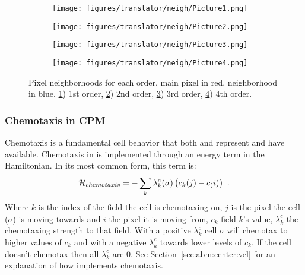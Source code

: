 \begin{figure}[H]
    \centering
    \begin{subfigure}{.45\textwidth}
        \texttt{[image: figures/translator/neigh/Picture1.png]}
        \caption{}\label{fig:trans:neigh:1}
    \end{subfigure}
    \begin{subfigure}{.45\textwidth}
        \texttt{[image: figures/translator/neigh/Picture2.png]}
        \caption{}\label{fig:trans:neigh:2}
    \end{subfigure}

    \begin{subfigure}{.45\textwidth}
        \texttt{[image: figures/translator/neigh/Picture3.png]}
        \caption{}\label{fig:trans:neigh:3}
    \end{subfigure}
    \begin{subfigure}{.45\textwidth}
        \texttt{[image: figures/translator/neigh/Picture4.png]}
        \caption{}\label{fig:trans:neigh:4}
    \end{subfigure}
    \caption{Pixel neighborhoods for each order, main pixel in red, neighborhood in blue. \ref{fig:trans:neigh:1}) 1st order, \ref{fig:trans:neigh:2}) 2nd order, \ref{fig:trans:neigh:3}) 3rd order, \ref{fig:trans:neigh:4}) 4th order.}
    \label{fig:trans:neigh}
\end{figure}



\subsubsection{Chemotaxis in CPM}\label{sec:abm:apm-history:chemotaxis-cpm}


Chemotaxis is a fundamental cell behavior that both \ccds and \pscs represent and have available. Chemotaxis in \ccds is implemented through an energy term in the Hamiltonian. In its most common form, this term is:
\begin{equation}
    \mathcal{H}_{chemotaxis} = - \sum_k \lambda^c_k(\sigma) \left( c_k(j) - c_(i)\right)\,\,.
\end{equation}
\noindent Where $k$ is the index of the field the cell is chemotaxing on, $j$ is the pixel the cell ($\sigma$) is moving towards and $i$ the pixel it is moving from, $c_k$ field $k$'s value,  $\lambda^c_k$ the chemotaxing strength to that field. With a positive $\lambda^c_k$ cell $\sigma$ will chemotax to higher values of $c_k$ and with a negative $\lambda^c_k$ towards lower levels of $c_k$. If the cell doesn't chemotax then all $\lambda^c_k$ are 0.
See Section~\ref{sec:abm:center:vel} for an explanation of how \pscs implements chemotaxis.


